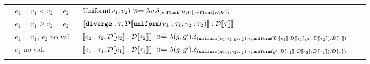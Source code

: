 \begin{table}[t]
\begin{center}
\begin{adjustbox}{width=\textwidth}
\begin{tabular}{l l l l l}
			& $e_1 = v_1 < v_2 = e_2$ &
		    $\text{Uniform}{(v_1, v_2)} \gg\!= \lambda v. \delta_{(v : \mathnormal{\textnormal{\ttfamily\bfseries float}}[B; V], v : \mathnormal{\textnormal{\ttfamily\bfseries float}}[B; V])}$  \\
			& $e_1 = v_1 \geq v_2 = e_2$ &
		    $\llbracket \textnormal{\ttfamily\bfseries diverge} : \tau, \mathcal{D}\llbracket \textnormal{\ttfamily\bfseries uniform}(v_1 : \tau_1,v_2 : \tau_2) \rrbracket : \mathcal{D}\llbracket \tau \rrbracket \rrbracket$  \\
			& $e_1=v_1$, $e_2$ no val.\ &  \\
			& $e_1$ no val.\ &  \\
			\midrule 
			

\end{tabular}
\end{adjustbox}
\end{center}
\end{table}
